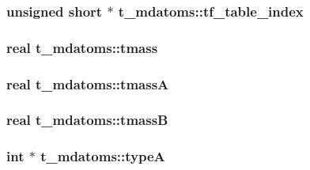 \hypertarget{structt__mdatoms_a0407ae92f037b9703414394b7cea6189}{
\subsubsection[{tf\-\_\-table\-\_\-index}]{\setlength{\rightskip}{0pt plus 5cm}unsigned short $\ast$ {\bf t\-\_\-mdatoms\-::tf\-\_\-table\-\_\-index}}}\label{structt__mdatoms_a0407ae92f037b9703414394b7cea6189}
\hypertarget{structt__mdatoms_a20bb948e877f68a0ff2ca046639a88c8}{
\subsubsection[{tmass}]{\setlength{\rightskip}{0pt plus 5cm}real {\bf t\-\_\-mdatoms\-::tmass}}}\label{structt__mdatoms_a20bb948e877f68a0ff2ca046639a88c8}
\hypertarget{structt__mdatoms_aa122f8a363598842d2d717a27d2c0243}{
\subsubsection[{tmass\-A}]{\setlength{\rightskip}{0pt plus 5cm}real {\bf t\-\_\-mdatoms\-::tmass\-A}}}\label{structt__mdatoms_aa122f8a363598842d2d717a27d2c0243}
\hypertarget{structt__mdatoms_ae55996d084a8607b48d8c0bb9e657191}{
\subsubsection[{tmass\-B}]{\setlength{\rightskip}{0pt plus 5cm}real {\bf t\-\_\-mdatoms\-::tmass\-B}}}\label{structt__mdatoms_ae55996d084a8607b48d8c0bb9e657191}
\hypertarget{structt__mdatoms_ac340e40d81d520d55adef7758aa73dc2}{
\subsubsection[{type\-A}]{\setlength{\rightskip}{0pt plus 5cm}int $\ast$ {\bf t\-\_\-mdatoms\-::type\-A}}}\label{structt__mdatoms_ac340e40d81d520d55adef7758aa73dc2}

